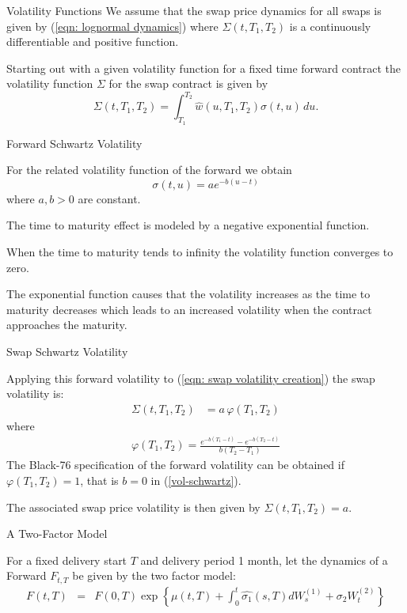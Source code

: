 
{Volatility Functions}
We assume that the swap price dynamics for all swaps is given by (\ref{eqn: lognormal dynamics})
where $\Sigma(t,T_1,T_2)$ is a continuously differentiable and positive function.

Starting out with a given volatility function for a fixed time forward contract the volatility function $\Sigma$ for the swap contract is given by
\begin{equation}
\Sigma(t,T_1,T_2)=\int_{T_1}^{T_2} \hat{w}(u,T_1,T_2) \sigma(t,u) \, du. \label{eqn: swap volatility creation}
\end{equation}

{Forward Schwartz Volatility}
\item<1-> For the related volatility function of the forward we obtain
\begin{equation}\label{vol-schwartz}
\sigma(t,u)=a e^{-b(u-t)}
\end{equation}
where $a,b >0 $ are constant.
\item<2->
The time to maturity effect is modeled by a negative exponential function.
\item When the time to maturity tends to infinity the volatility function converges to zero.
\item The exponential function causes that the volatility increases as the time to maturity decreases which leads to an increased volatility when the contract approaches the maturity.

{Swap Schwartz Volatility}

Applying this forward volatility to (\ref{eqn: swap volatility creation}) the swap volatility is:
\begin{align}
\Sigma(t,T_1,T_2)&=a\,\varphi(T_1,T_2)
\end{align}
where
\begin{align}
\varphi(T_1,T_2)= \frac{e^{-b(T_1-t)}-e^{-b(T_2-t)}}{b(T_2-T_1)}
\label{volatility function varphi}
\end{align}
The Black-76 specification of the forward volatility can be obtained if $\varphi(T_1,T_2) =1$, that is $b=0$
in (\ref{vol-schwartz}).

The associated swap price volatility is then given by $\Sigma(t,T_1,T_2)=a$.

{A Two-Factor Model}
\item<1-> For a fixed delivery start $T$ and delivery period 1 month, let the dynamics of a Forward $F_{t,T}$ be given by the two factor model:
\begin{eqnarray*}
F(t,T)& =&F(0,T)\exp\left\{\mu(t,T)  +\int_0^t\hat{\sigma_1}(s,T)dW_s^{(1)}+\sigma_2W_t^{(2)}\right\}
\end{eqnarray*}

